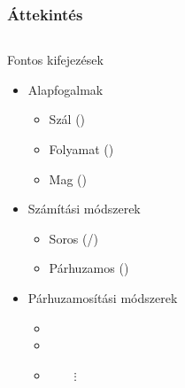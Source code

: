 \begin{frame}
\frametitle{Áttekintés}

\begin{columns}
	\begin{exampleblock}{Fontos kifejezések}
		\begin{itemize}
			\item Alapfogalmak
			\begin{itemize}
				\item Szál ()
				\item Folyamat ()
				\item Mag ()
			\end{itemize}
			\item Számítási módszerek
			\begin{itemize}
				\item Soros (/)
				\item Párhuzamos ()
			\end{itemize}
			\item Párhuzamosítási módszerek
			\begin{itemize}
				\item {}
				\item {}
				\item[] $\qquad \vdots$
			\end{itemize}
		\end{itemize}
	\end{exampleblock}
	

\end{columns}
\end{frame}

